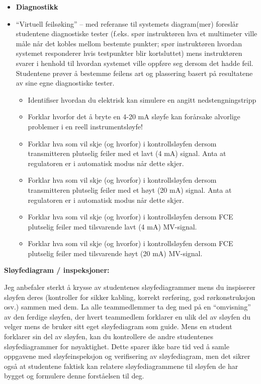 \begin{itemize}
\item{} {\bf Diagnostikk}
\item{} ``Virtuell feilsøking'' -- med referanse til systemets diagram(mer) foreslår studentene diagnostiske tester (f.eks. spør instruktøren hva et multimeter ville måle når det kobles mellom bestemte punkter; spør instruktøren hvordan systemet responderer hvis testpunkter blir kortsluttet) mens instruktøren svarer i henhold til hvordan systemet ville oppføre seg dersom det hadde feil.  Studentene prøver å bestemme feilens art og plassering basert på resultatene av sine egne diagnostiske tester.
\begin{itemize}

\item{} Identifiser hvordan du elektrisk kan simulere en angitt nedstengningstripp
\item{} Forklar hvorfor det å bryte en 4-20 mA sløyfe kan forårsake alvorlige problemer i en reell instrumentsløyfe!
\item{} Forklar hva som vil skje (og hvorfor) i kontrollsløyfen dersom transmitteren plutselig feiler med et lavt (4 mA) signal.  Anta at regulatoren er i automatisk modus når dette skjer.
\item{} Forklar hva som vil skje (og hvorfor) i kontrollsløyfen dersom transmitteren plutselig feiler med et høyt (20 mA) signal.  Anta at regulatoren er i automatisk modus når dette skjer.
\item{} Forklar hva som vil skje (og hvorfor) i kontrollsløyfen dersom FCE plutselig feiler med tilsvarende lavt (4 mA) MV-signal.
\item{} Forklar hva som vil skje (og hvorfor) i kontrollsløyfen dersom FCE plutselig feiler med tilsvarende høyt (20 mA) MV-signal.
\end{itemize}
\end{itemize}















\noindent
{\bf Sløyfediagram / inspeksjoner:}

Jeg anbefaler sterkt å krysse av studentenes sløyfediagrammer mens du inspiserer sløyfen deres (kontroller for sikker kabling, korrekt rørføring, god rørkonstruksjon osv.) sammen med dem.  La alle teammedlemmer ta deg med på en ``omvisning'' av den ferdige sløyfen, der hvert teammedlem forklarer en ulik del av sløyfen du velger mens de bruker sitt eget sløyfediagram som guide.  Mens en student forklarer sin del av sløyfen, kan du kontrollere de andre studentenes sløyfediagrammer for nøyaktighet.  Dette sparer ikke bare tid ved å samle oppgavene med sløyfeinspeksjon og verifisering av sløyfediagram, men det sikrer også at studentene faktisk kan relatere sløyfediagrammene til sløyfen de har bygget og formulere denne forståelsen til deg.


